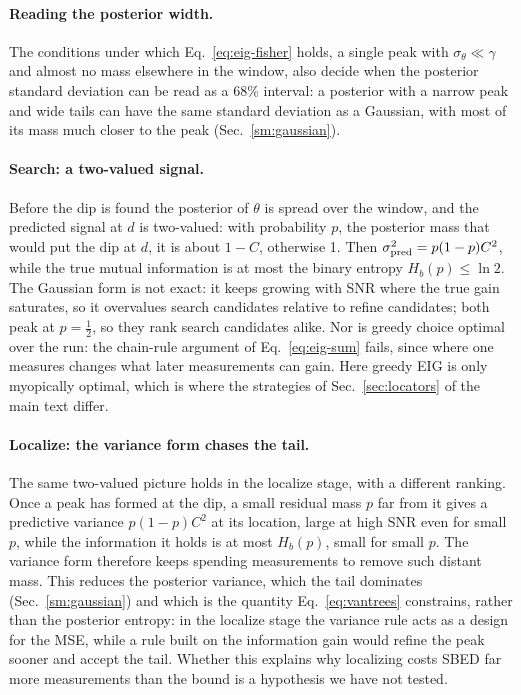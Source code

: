 \paragraph{Reading the posterior width.} The conditions under which Eq.~\eqref{eq:eig-fisher} holds, a single peak
with $\sigma_\theta\ll\gamma$ and almost no mass elsewhere in the window, also decide when the posterior standard
deviation can be read as a 68\% interval: a posterior with a narrow peak and wide tails can have the same standard
deviation as a Gaussian, with most of its mass much closer to the peak (Sec.~\ref{sm:gaussian}).

\paragraph{Search: a two-valued signal.} Before the dip is found the posterior of $\theta$ is spread over the window,
and the predicted signal at $d$ is two-valued: with probability $p$, the posterior mass that would put the dip at $d$,
it is about $1-C$, otherwise 1. Then $\sigma^2_{\rm pred}=p(1-p)C^2$, while the true mutual information is at most the
binary entropy $H_b(p)\le\ln2$. The Gaussian form is not exact: it keeps growing with SNR where the true gain saturates, so it
overvalues search candidates relative to refine candidates; both peak at $p=\tfrac12$, so they rank search
candidates alike. Nor is greedy choice optimal over the run: the chain-rule argument of Eq.~\eqref{eq:eig-sum} fails, since where one measures changes
what later measurements can gain. Here greedy EIG is only myopically optimal, which is where the strategies of
Sec.~\ref{sec:locators} of the main text differ.

\paragraph{Localize: the variance form chases the tail.} The same two-valued picture holds in the localize stage,
with a different ranking. Once a peak has formed at the dip, a small residual mass $p$ far from it gives a predictive
variance $p(1-p)C^2$ at its location, large at high SNR even for small $p$, while the information it holds is at most
$H_b(p)$, small for small $p$. The variance form therefore keeps spending measurements to remove such distant mass.
This reduces the posterior variance, which the tail dominates (Sec.~\ref{sm:gaussian}) and which is the quantity
Eq.~\eqref{eq:vantrees} constrains, rather than the posterior entropy: in the localize stage the variance rule acts
as a design for the MSE, while a rule built on the information gain would refine the peak sooner and accept the
tail. Whether this explains why localizing costs SBED far more measurements than the bound is a hypothesis we have
not tested.
